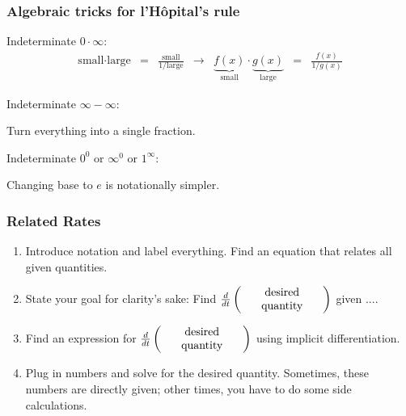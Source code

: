 \documentclass[aspectratio=169, 12pt]{beamer}
\begin{document}
\begin{frame}
  \frametitle{Algebraic tricks for l'H\^opital's rule}

  Indeterminate \(0 \cdot \infty\):
  \[
    \begin{array}{rclcrcl}
      \text{small} \cdot \text{large} &=& \frac{\text{small}}{1/\text{large}} &\longrightarrow& \underbrace{f(x)}_{\text{small}} \cdot \underbrace{g(x)}_{\text{large}} &=& \frac{f(x)}{1/g(x)}
    \end{array}
  \]

  Indeterminate \(\infty - \infty\):

  \begin{center}
    Turn everything into a single fraction.
  \end{center}

  Indeterminate \(0^{0}\) or \(\infty^{0}\) or \(1^{\infty}\):

  \begin{center}
    Changing base to \(e\) is notationally simpler.
  \end{center}
\end{frame}

\begin{frame}
  \frametitle{Related Rates}

  \begin{enumerate}
    \item Introduce notation and label everything. Find an equation that relates all given quantities.
    \item State your goal for clarity's sake: Find \(\frac{d}{dt} \left(\parbox{1in}{\centering desired\\quantity}\right)\) given ....
    \item Find an expression for \(\frac{d}{dt} \left(\parbox{1in}{\centering desired\\quantity}\right)\) using implicit differentiation.
    \item Plug in numbers and solve for the desired quantity. Sometimes, these numbers are directly given; other times, you have to do some side calculations.
  \end{enumerate}
\end{frame}
\end{document}
